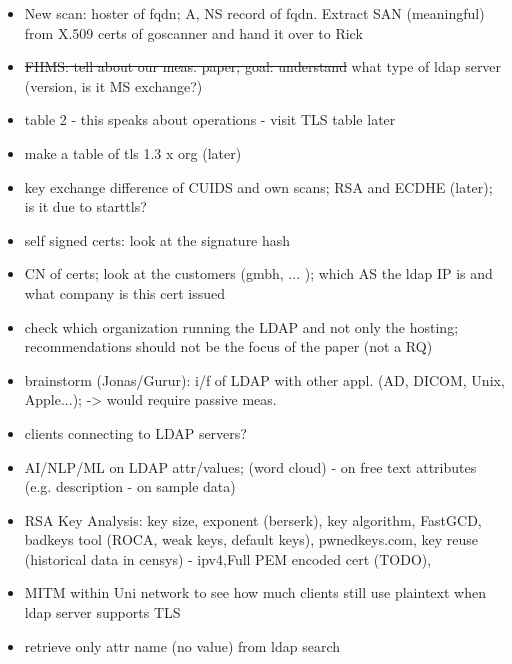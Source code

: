 \begin{itemize}
    \item New scan: hoster of fqdn; A, NS record of fqdn. Extract SAN (meaningful) from X.509 certs of goscanner and hand it over to Rick
    \item \st{FHMS: tell about our meas. paper; goal: understand} what type of ldap server (version, is it MS exchange?)
    \item table 2 - this speaks about operations - visit TLS table later
    \item make a table of tls 1.3 x org (later)
    \item key exchange difference of CUIDS and own scans; RSA and ECDHE (later); is it due to starttls?
    \item self signed certs: look at the signature hash
    \item CN of certs; look at the customers (gmbh, ... ); which AS the ldap IP is and what company is this cert issued
    \item check which organization running the LDAP and not only the hosting; recommendations should not be the focus of the paper (not a RQ)

    \item brainstorm (Jonas/Gurur): i/f of LDAP with other appl. (AD, DICOM, Unix, Apple...); -> would require passive meas.
    \item clients connecting to LDAP servers?
    \item AI/NLP/ML on LDAP attr/values; (word cloud) - on free text attributes (e.g. description - on sample data)
    \item RSA Key Analysis: key size, exponent (berserk), key algorithm, FastGCD, badkeys tool (ROCA, weak keys, default keys), pwnedkeys.com, key reuse (historical data in censys) - ipv4,Full PEM encoded cert (TODO), 
    \item MITM within Uni network to see how much clients still use plaintext when ldap server supports TLS
    \item retrieve only attr name (no value) from ldap search

\end{itemize}

\vfill
\pagebreak
\twocolumn
